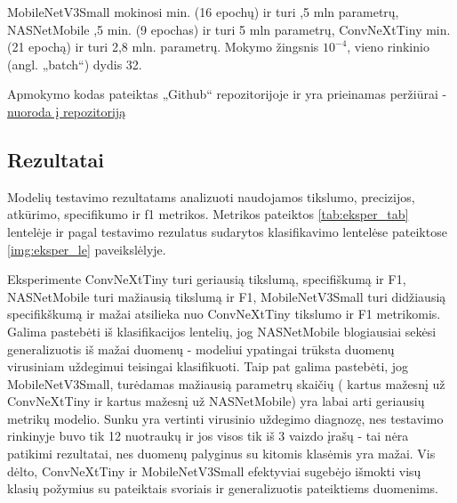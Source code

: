 \documentclass[fleqn]{VUMIFKompMagistrinis}
\begin{document}
\par
MobileNetV3Small mokinosi  min. (16 epochų) ir turi ,5 mln parametrų, NASNetMobile ,5 min. (9 epochas) ir turi 5 mln parametrų, ConvNeXtTiny  min. (21 epochą) ir turi 2,8 mln. parametrų. Mokymo žingsnis \(10^{-4}\), vieno rinkinio (angl. „batch“) dydis 32. 
\par
Apmokymo kodas pateiktas „Github“ repozitorijoje ir yra prieinamas peržiūrai - \underline{\href{https://github.com/JustasBan/kursinio-modeliai}{nuoroda į repozitoriją}}


\subsection{Rezultatai}
Modelių testavimo rezultatams analizuoti naudojamos tikslumo, precizijos, atkūrimo, specifikumo ir f1 metrikos. Metrikos pateiktos \ref{tab:eksper_tab} lentelėje ir pagal testavimo rezulatus sudarytos klasifikavimo lentelėse pateiktose \ref{img:eksper_le} paveikslėlyje.
\par
Eksperimente ConvNeXtTiny turi geriausią tikslumą, specifiškumą ir F1, NASNetMobile turi mažiausią tikslumą ir F1, MobileNetV3Small turi didžiausią specifikškumą ir mažai atsilieka nuo ConvNeXtTiny tikslumo ir F1 metrikomis. Galima pastebėti iš klasifikacijos lentelių, jog NASNetMobile blogiausiai sekėsi generalizuotis iš mažai duomenų - modeliui ypatingai trūksta duomenų virusiniam uždegimui teisingai klasifikuoti. Taip pat galima pastebėti, jog MobileNetV3Small, turėdamas mažiausią parametrų skaičių ( kartus mažesnį už ConvNeXtTiny ir  kartus mažesnį už NASNetMobile) yra labai arti geriausių metrikų modelio. Sunku yra vertinti virusinio uždegimo diagnozę, nes testavimo rinkinyje buvo tik 12 nuotraukų ir jos visos tik iš 3 vaizdo įrašų - tai nėra patikimi rezultatai, nes duomenų palyginus su kitomis klasėmis yra mažai. Vis dėlto, ConvNeXtTiny ir MobileNetV3Small efektyviai sugebėjo išmokti visų klasių požymius su pateiktais svoriais ir generalizuotis pateiktiems duomenims. 
\end{document}
